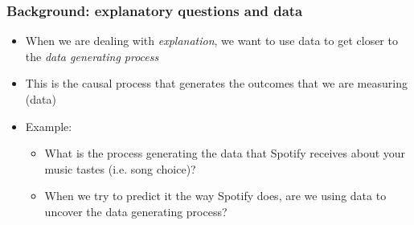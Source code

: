 \documentclass[aspectratio=43]{beamer}
\begin{document}
\begin{frame}
\frametitle{Background: explanatory questions and data}
\centering

\begin{itemize}
  \item When we are dealing with \textit{explanation}, we want to use data to get closer to the \textit{data generating process}
  \item This is the causal process that generates the outcomes that we are measuring (data)
  \item<2-> Example:
  \begin{itemize}
    \item What is the process generating the data that Spotify receives about your music tastes (i.e. song choice)?
    \item<3-> When we try to predict it the way Spotify does, are we using data to uncover the data generating process?
  \end{itemize}
\end{itemize}

\end{frame}

%
%
\end{document}
